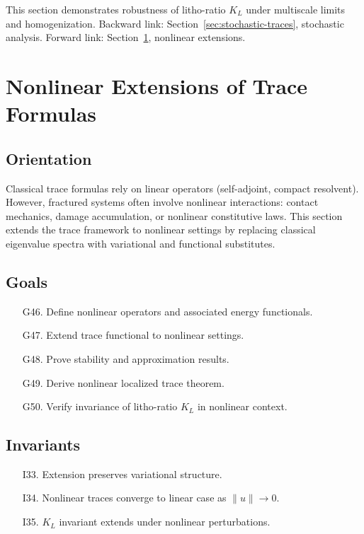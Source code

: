 This section demonstrates robustness of litho-ratio $K_L$ under multiscale limits and homogenization.  
Backward link: Section~\ref{sec:stochastic-traces}, stochastic analysis.  
Forward link: Section~\ref{sec:nonlinear-traces}, nonlinear extensions.  

\section{Nonlinear Extensions of Trace Formulas}
\label{sec:nonlinear-traces}

\subsection*{Orientation}

Classical trace formulas rely on linear operators (self-adjoint, compact resolvent).  
However, fractured systems often involve nonlinear interactions:  
contact mechanics, damage accumulation, or nonlinear constitutive laws.  
This section extends the trace framework to nonlinear settings by replacing classical eigenvalue spectra with variational and functional substitutes.  

\subsection*{Goals}

\begin{itemize}
  \item[G46.] Define nonlinear operators and associated energy functionals.  
  \item[G47.] Extend trace functional to nonlinear settings.  
  \item[G48.] Prove stability and approximation results.  
  \item[G49.] Derive nonlinear localized trace theorem.  
  \item[G50.] Verify invariance of litho-ratio $K_L$ in nonlinear context.  
\end{itemize}

\subsection*{Invariants}

\begin{itemize}
  \item[I33.] Extension preserves variational structure.  
  \item[I34.] Nonlinear traces converge to linear case as $\|u\|\to 0$.  
  \item[I35.] $K_L$ invariant extends under nonlinear perturbations.  
\end{itemize}


